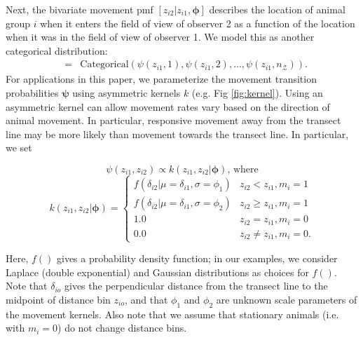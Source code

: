 \documentclass[aoas,preprint]{imsart}
\numberwithin{equation}{section}
\theoremstyle{plain}
\begin{document}
Next, the bivariate movement pmf $[z_{i2}|z_{i1},\boldsymbol{\phi}]$ describes the location of animal group $i$ when it enters the field of view of observer 2 as a function of the location when it was in the field of view of observer 1.  We model this as another categorical distribution:
\begin{eqnarray}
  [z_{i2}|z_{i1},\boldsymbol{\phi}] & = & \text{Categorical} \left( \psi(z_{i1},1),\psi(z_{i1},2),\hdots,\psi(z_{i1},n_\mathcal{Z}) \right).
  \label{eqn:move}
\end{eqnarray}
For applications in this paper, we parameterize the movement transition probabilities $\boldsymbol{\psi}$ using asymmetric kernels $k$ (e.g. Fig \ref{fig:kernel}).  Using an asymmetric kernel can allow movement rates vary based on the direction of animal movement.  In particular, responsive movement away from the transect line may be more likely than movement towards the transect line. In particular, we set
\begin{linenomath*}
\begin{equation}
  \psi(z_{i1},z_{i2}) \propto k(z_{i1},z_{i2}|\boldsymbol{\phi}) \text{, where}
  \label{eq:psi}
\end{equation}
\begin{equation}
  k(z_{i1},z_{i2}|\boldsymbol{\phi}) = \left\{ \begin{array}{rl}
                                    f(\delta_{i2}|\mu=\delta_{i1},\sigma=\phi_1) & z_{i2}<z_{i1}, m_i = 1 \\
                                    f(\delta_{i2}|\mu=\delta_{i1},\sigma=\phi_2) & z_{i2} \ge z_{i1}, m_i = 1  \\
                                    1.0 & z_{i2}=z_{i1}, m_i=0 \\
                                    0.0 & z_{i2} \ne z_{i1}, m_i=0.
                                    \end{array} \right.
  \label{eq:g}
\end{equation}
\end{linenomath*}
Here, $f()$ gives a probability density function; in our examples, we consider Laplace (double exponential) and Gaussian distributions as choices for $f()$. Note that $\delta_{io}$ gives the perpendicular distance from the transect line to the midpoint of distance bin $z_{io}$, and that $\phi_1$ and $\phi_2$ are unknown scale parameters of the movement kernels.  Also note that we assume that stationary animals (i.e. with $m_i=0$) do not change distance bins.
\end{document}
